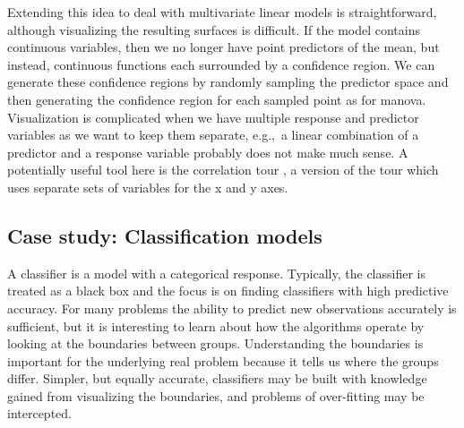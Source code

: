 \documentclass[preprint]{imsart}
\begin{document}

Extending this idea to deal with multivariate linear models is straightforward, although visualizing the resulting surfaces is difficult.  If the model contains continuous variables, then we  no longer have point predictors of the mean, but instead, continuous functions each surrounded by a confidence region.  We can generate these confidence regions by randomly sampling the predictor space and then generating the confidence region for each sampled point as for {\sc manova}.  Visualization is complicated when we have multiple response and predictor variables as we want to keep them separate, e.g.,\ a linear combination of a predictor and a response variable probably does not make much sense.  A potentially useful tool here is the correlation tour \citep{buja:1996}, a version of the tour which uses separate sets of variables for the x and y axes.


\subsection{Case study: Classification models}
\label{sub:classifly}

A classifier is a model with a categorical response.  Typically, the classifier is treated as a black box and the focus is on finding classifiers with high predictive accuracy. For many problems the ability to predict new observations accurately is sufficient, but it is interesting to learn about how the algorithms operate by looking at the boundaries between groups. Understanding the boundaries is important for the underlying real problem because it tells us where the groups differ. Simpler, but equally accurate, classifiers may be built with knowledge gained from visualizing the boundaries, and problems of over-fitting may be intercepted.
\end{document}
